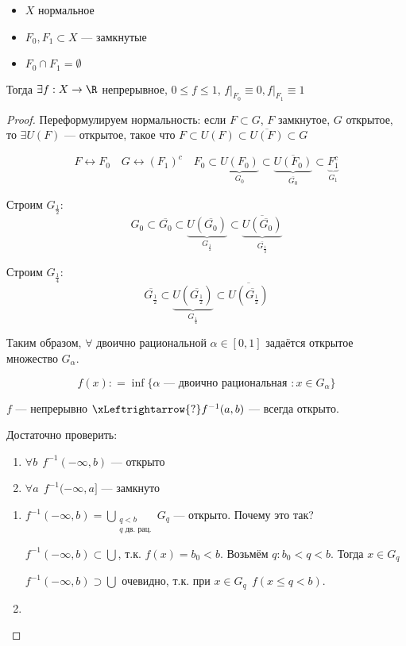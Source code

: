 \begin{lemma}[Урысона]\itemfix
    \begin{itemize}
        \item \(X\) нормальное
        \item \(F_0, F_1 \subset X\) --- замкнутые
        \item \(F_0 \cap F_1 = \emptyset\)
    \end{itemize}

    Тогда \(\exists f : X \to \R\) непрерывное, \(0 \leq f \leq 1\), \(f\Big|_{F_0} \equiv 0, f\Big|_{F_1}\equiv 1\)
\end{lemma}
\begin{proof}
    Переформулируем нормальность: если \(F\subset G\), \(F\) замкнутое, \(G\) открытое, то \(\exists U(F)\) --- открытое, такое что \(F \subset U(F) \subset \overline{U(F)} \subset G\)

    \[F \leftrightarrow F_0 \quad G \leftrightarrow (F_1)^c \quad F_0 \subset \underbrace{U(F_0)}_{G_0} \subset \underbrace{\overline{U(F_0)}}_{\overline{G_0}} \subset \underbrace{F_1^c}_{G_1}\]

    Строим \(G_{\frac{1}{2}}\):
    \[G_0 \subset \overline{G_0} \subset \underbrace{U(\overline{G_0})}_{G_\frac{1}{2}} \subset \underbrace{\overline{U(\overline{G_0})}}_{\overline{G_{\frac{1}{2}}}}\]

    Строим \(G_{\frac{1}{4}}\):
    \[\overline{G_{\frac{1}{2}}} \subset \underbrace{U(\overline{G_{\frac{1}{2}}})}_{G_\frac{1}{4}} \subset \overline{U(\overline{G_{\frac{1}{2}}})}\]

    Таким образом, \(\forall \) двоично рациональной \(\alpha \in [0, 1]\) задаётся открытое множество \(G_\alpha\).

    \[f(x) : = \inf \{\alpha \text{ --- двоично рациональная } : x\in G_\alpha\} \]

    \(f\) --- непрерывно \(\xLeftrightarrow{?} f^{ - 1}(a, b)\) --- всегда открыто.

    Достаточно проверить:
    \begin{enumerate}
        \item \(\forall b \ \ f^{ - 1}( -\infty, b)\) --- открыто
        \item \(\forall a \ \ f^{ - 1}( -\infty, a]\) --- замкнуто
    \end{enumerate}

    \begin{enumerate}
        \item \(f^{ - 1}( - \infty, b) = \bigcup\limits_{\substack{q < b \\ q \text{ дв. рац.}}} G_q\) --- открыто. Почему это так?

              \(f^{ - 1}( - \infty, b) \subset \bigcup\), т.к. \(f(x) = b_0 < b\). Возьмём \(q : b_0 < q < b\). Тогда \(x\in G_q\)

              \(f^{ - 1}( - \infty, b) \supset \bigcup\) очевидно, т.к. при \(x\in G_q \ \ f(x \leq q < b)\).

        \item \unfinished
    \end{enumerate}
\end{proof}

